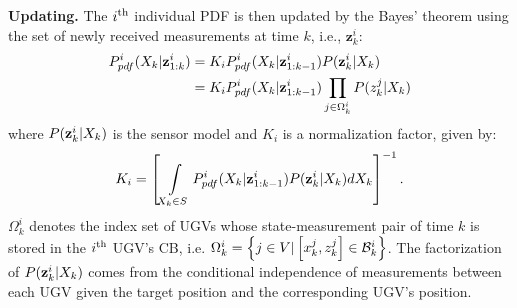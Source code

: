 	\textbf{Updating.}
	The $i^\text{th}$ individual PDF is then updated by the Bayes' theorem using the set of newly received measurements at time $k$, i.e., $\mathbf{z}^i_k$:
		\small\begin{align*}\label{eqn:bayes_upd}
			P^i_{pdf}(X_k|\mathbf{z}^i_{1:k})
			&= K_iP^i_{pdf}(X_k|\mathbf{z}^i_{1:k-1})P(\mathbf{z}^i_k|X_k)\\
			&=K_iP^i_{pdf}(X_k|\mathbf{z}^i_{1:k-1})\prod\limits_{j\in\Omega^i_k}P(z^j_k|X_{k})
		\end{align*}\normalsize
	where $P(\mathbf{z}^i_k|X_k)$ is the sensor model and $K_i$ is a normalization factor, given by:
	\small\begin{align*}
	K_i=\left[\int\limits_{X_k\in S} P^i_{pdf}(X_k|\mathbf{z}^i_{1:k-1})P(\mathbf{z}^i_k|X_k)dX_k\right]^{-1}.
	\end{align*}\normalsize
	$\Omega^i_k$ denotes the index set of UGVs whose state-measurement pair of time $k$ is stored in the $i^\text{th}$ UGV's CB, i.e. $\Omega^i_k=\left\lbrace j\in V | \left[x^j_k,z^j_k\right]\in \mathcal{B}^i_k\right\rbrace$.
	The factorization of $P(\mathbf{z}^i_k|X_k)$ comes from the conditional independence of measurements between each UGV given the target position and the corresponding UGV's position.	
	
